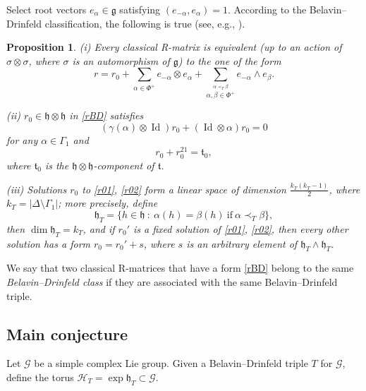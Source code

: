 \documentclass{amsart}
\newtheorem{proposition}[theorem]{Proposition}
\theoremstyle{definition}
\theoremstyle{remark}
\numberwithin{equation}{section}
\numberwithin{theorem}{section}
\begin{document}
Select root vectors $e_\alpha \in{\mathfrak g}$ satisfying 
$(e_{-\alpha},e_\alpha)=1$. According to the Belavin--Drinfeld classification, the following is true (see, e.g., \cite[Chap.~3]{CP}).

\begin{proposition}\label{bdclass}
{\rm(i)} Every classical R-matrix is equivalent {\rm(}up to an action of $\sigma\otimes\sigma$, where $\sigma$ is an 
automorphism of ${\mathfrak g}$\/{\rm)} to the one of the form
\begin{equation}
\label{rBD}
r= r_0 + \sum_{\alpha\in \Phi^+} e_{-\alpha}\otimes e_\alpha + \sum_{\stackrel{\alpha \prec_T \beta}{\alpha,\beta\in\Phi^+}} e_{-\alpha}\wedge e_\beta.
\end{equation}

{\rm(ii)} $r_0\in {\mathfrak h}\otimes{\mathfrak h}$ in \eqref{rBD} satisfies 
\begin{equation}
(\gamma(\alpha)\otimes {{\operatorname {Id}}} )r_0 + ({{\operatorname {Id}}}\otimes \alpha )r_0 = 0  
\label{r01}
\end{equation}
for any $\alpha\in\Gamma_1$ and
\begin{equation}
r_0 + r_0^{21} = \mathfrak{t}_0,
\label{r02}
\end{equation}
where $\mathfrak{t}_0$ is the ${\mathfrak h}\otimes{\mathfrak h}$-component of $\mathfrak{t}$. 

{\rm(iii)} Solutions $r_0$ to \eqref{r01}, \eqref{r02}
form a linear space of dimension $\frac{k_T(k_T-1)}{2}$, where 
$k_T= | \Delta \setminus \Gamma_1 |$; more precisely, define
\begin{equation*}
{\mathfrak h}_T=\{ h\in{\mathfrak h} \ : \ \alpha(h)=\beta(h)\ \mbox{if}\ \alpha\prec_T\beta\}, 
\end{equation*}
then ${\operatorname{dim}}{\mathfrak h}_T=k_T$, and if $r_0'$ is a fixed solution of \eqref{r01}, \eqref{r02}, then
every other solution has a form $r_0=r_0' + s$, where $s$ is an arbitrary element of ${\mathfrak h}_T\wedge{\mathfrak h}_T$.
\end{proposition}

We say that two classical R-matrices that have a form \eqref{rBD} belong to the same {\em Belavin--Drinfeld class\/}
if they are associated with the same Belavin--Drinfeld triple.

\subsection{Main conjecture}
Let ${{\mathcal G}}$ 
be a simple complex Lie group. Given a Belavin--Drinfeld triple $T$ for ${{\mathcal G}}$,
define the torus ${\mathcal H}_T=\exp {\mathfrak h}_T\subset{{\mathcal G}}$.
\end{document}
